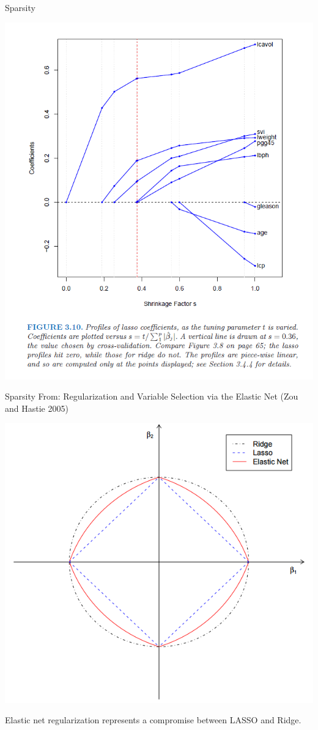 \documentclass{beamer}\usepackage[]{graphicx}\usepackage[]{color}
\begin{document}
\begin{frame}{Sparsity}
\begin{center}
\includegraphics[scale=.25]{LassoProfile}\\
\end{center}
\end{frame}

\begin{frame}{Sparsity}
From: Regularization and Variable Selection via the Elastic Net (Zou and Hastie 2005)\\
\begin{center}
\includegraphics[scale=.35]{RidgevElasticvLASSO}\\
\end{center}
Elastic net regularization represents a compromise between LASSO and Ridge.
\end{frame}
\end{document}

